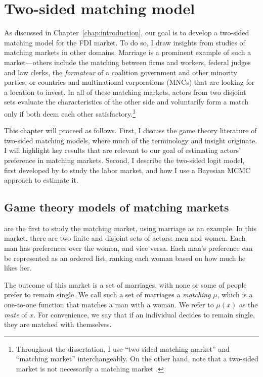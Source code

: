 \chapter{Two-sided matching model}
\label{chap:model}

As discussed in Chapter~\ref{chap:introduction}, our goal is to develop a
two-sided matching model for the FDI market. To do so, I draw insights from
studies of matching markets in other domains. Marriage is a prominent example of
such a market---others include the matching between firms and workers, federal
judges and law clerks, the \textit{formateur} of a coalition government and
other minority parties, or countries and multinational corporations (MNCs) that
are looking for a location to invest. In all of these matching markets, actors
from two disjoint sets evaluate the characteristics of the other side and
voluntarily form a match only if both deem each other
satisfactory.\footnote{Throughout the dissertation, I use ``two-sided matching
  market'' and ``matching market'' interchangeably. On the other hand, note that
  a two-sided market is not necessarily a matching market \citep{Rysman2009}.}

This chapter will proceed as follows. First, I discuss the game theory
literature of two-sided matching models, where much of the terminology and
insight originate. I will highlight key results that are relevant to our goal of
estimating actors' preference in matching markets. Second, I describe the
two-sided logit model, first developed by \citet{Logan1996} to study the labor
market, and how I use a Bayesian MCMC approach to estimate it.

\section{Game theory models of matching markets}
\label{sec:game_theory}

\citet{Gale1962} are the first to study the matching market, using marriage as
an example. In this market, there are two finite and disjoint sets of actors:
men and women. Each man has preferences over the women, and vice versa. Each
man's preference can be represented as an ordered list, ranking each woman based
on how much he likes her.

The outcome of this market is a set of marriages, with none or some of people
prefer to remain single. We call such a set of marriages a \textit{matching}
$\mu$, which is a one-to-one function that matches a man with a woman. We refer
to $\mu(x)$ as the \textit{mate} of $x$. For convenience, we say that if an
individual decides to remain single, they are matched with themselves.

